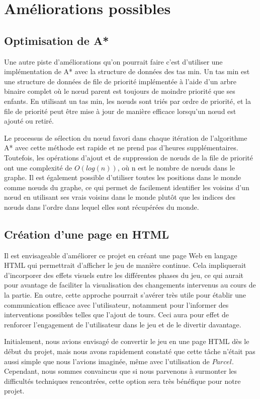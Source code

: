 \documentclass[11pt]{article}
\begin{document}
    \section{Améliorations possibles}
    
        \subsection{Optimisation de A*}
        Une autre piste d'améliorations qu'on pourrait faire c'est d'utiliser une implémentation de A* avec la structure de données des tas min. Un tas min est une structure de données de file de priorité implémentée à l'aide d'un arbre binaire complet où le nœud parent est toujours de moindre priorité que ses enfants. En utilisant un tas min, les nœuds sont triés par ordre de priorité, et la file de priorité peut être mise à jour de manière efficace lorsqu'un nœud est ajouté ou retiré.
        
        Le processus de sélection du nœud favori dans chaque itération de l'algorithme A* avec cette méthode est rapide et ne prend pas d'heures supplémentaires. Toutefois, les opérations d'ajout et de suppression de nœuds de la file de priorité ont une complexité de $O(log(n))$, où n est le nombre de nœuds dans le graphe. Il est également possible d'utiliser toutes les positions dans le monde comme nœuds du graphe, ce qui permet de facilement identifier les voisins d'un nœud en utilisant ses vrais voisins dans le monde plutôt que les indices des nœuds dans l'ordre dans lequel elles sont récupérées du monde.
        \subsection{Création d'une page en HTML}
       
        Il est envisageable d'améliorer ce projet en créant une page Web en langage HTML qui permettrait d'afficher le jeu de manière continue. Cela impliquerait d'incorporer des effets visuels entre les différentes phases du jeu, ce qui aurait pour avantage de faciliter la visualisation des changements intervenus au cours de la partie. En outre, cette approche pourrait s'avérer très utile pour établir une communication efficace avec l'utilisateur, notamment pour l'informer des interventions possibles telles que l'ajout de tours. Ceci aura pour effet de renforcer l'engagement de l'utilisateur dans le jeu et de le divertir davantage.
        
        Initialement, nous avions envisagé de convertir le jeu en une page HTML dès le début du projet, mais nous avons rapidement constaté que cette tâche n'était pas aussi simple que nous l'avions imaginée, même avec l'utilisation de $Parcel$. Cependant, nous sommes convaincus que si nous parvenons à surmonter les difficultés techniques rencontrées, cette option sera très bénéfique pour notre projet.
\end{document}
